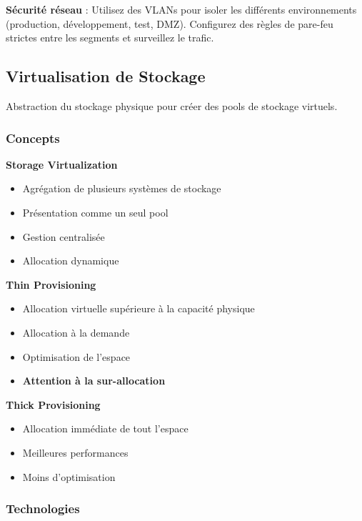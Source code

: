 \documentclass[11pt,a4paper]{article}
\begin{document}
\begin{tipbox}
\textbf{Sécurité réseau} : Utilisez des VLANs pour isoler les différents environnements (production, développement, test, DMZ). Configurez des règles de pare-feu strictes entre les segments et surveillez le trafic.
\end{tipbox}

\subsection{Virtualisation de Stockage}

Abstraction du stockage physique pour créer des pools de stockage virtuels.

\subsubsection{Concepts}

\textbf{Storage Virtualization}
\begin{itemize}
    \item Agrégation de plusieurs systèmes de stockage
    \item Présentation comme un seul pool
    \item Gestion centralisée
    \item Allocation dynamique
\end{itemize}

\textbf{Thin Provisioning}
\begin{itemize}
    \item Allocation virtuelle supérieure à la capacité physique
    \item Allocation à la demande
    \item Optimisation de l'espace
    \item \textbf{Attention à la sur-allocation}
\end{itemize}

\textbf{Thick Provisioning}
\begin{itemize}
    \item Allocation immédiate de tout l'espace
    \item Meilleures performances
    \item Moins d'optimisation
\end{itemize}

\subsubsection{Technologies}
\end{document}

